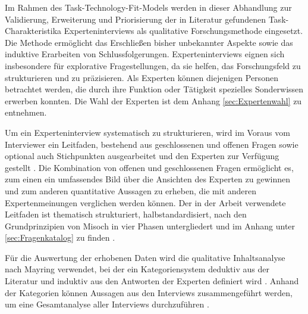 Im Rahmen des Task-Technology-Fit-Models werden in dieser Abhandlung zur Validierung, Erweiterung und Priorisierung der in Literatur gefundenen Task-Charakteristika Experteninterviews als qualitative Forschungsmethode eingesetzt. Die Methode ermöglicht das Erschließen bisher unbekannter Aspekte sowie das induktive Erarbeiten von Schlussfolgerungen. Experteninterviews eignen sich insbesondere für explorative Fragestellungen, da sie helfen, das Forschungsfeld zu strukturieren und zu präzisieren. Als Experten können diejenigen Personen betrachtet werden, die durch ihre Funktion oder Tätigkeit spezielles Sonderwissen erwerben konnten. \autocite[Vgl.][S. 119-127]{MISOCH2019} Die Wahl der Experten ist dem Anhang \ref{sec:Expertenwahl} zu entnehmen.

Um ein Experteninterview systematisch zu strukturieren, wird im Voraus vom Interviewer ein Leitfaden, bestehend aus geschlossenen und offenen Fragen sowie optional auch Stichpunkten ausgearbeitet und den Experten zur Verfügung gestellt \autocite[Vgl.][S. 670]{HELFFERICH2019}. Die Kombination von offenen und geschlossenen Fragen ermöglicht es, zum einen ein umfassendes Bild über die Ansichten des Experten zu gewinnen und zum anderen quantitative Aussagen zu erheben, die mit anderen Expertenmeinungen verglichen werden können. Der in der Arbeit verwendete Leitfaden ist thematisch strukturiert, halbstandardisiert, nach den Grundprinzipien von Misoch in vier Phasen untergliedert und im Anhang unter \ref{sec:Fragenkatalog} zu finden \autocite[Vgl.][S. 68f]{MISOCH2019}.  

Für die Auswertung der erhobenen Daten wird die qualitative Inhaltsanalyse nach Mayring verwendet, bei der ein Kategoriensystem deduktiv aus der Literatur und induktiv aus den Antworten der Experten definiert wird \autocite[Vgl.][S. 633-634]{MAYRING2019}. Anhand der Kategorien können Aussagen aus den Interviews zusammengeführt werden, um eine Gesamtanalyse aller Interviews durchzuführen \autocite[Vgl.][S. 74]{BOGNER2014}. 




